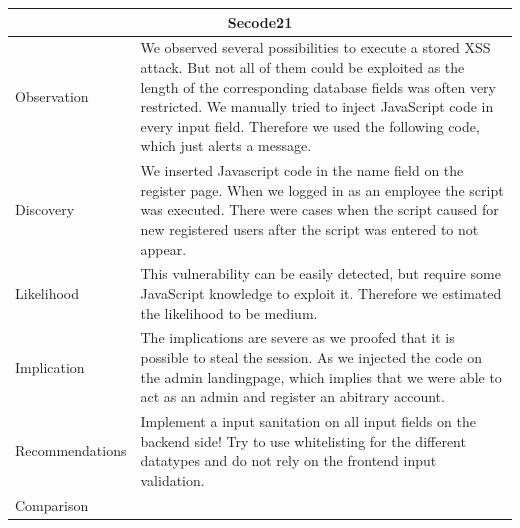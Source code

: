 \documentclass[headsepline,footsepline,footinclude=false,oneside,fontsize=11pt,paper=a4,listof=totoc,bibliography=totoc]{scrbook} %
\begin{document}
\begin{tabular}{ l|p{11cm}  }
	\hline
	\multicolumn{2}{c}{\textbf{Secode21}} \\
	\hline
	Observation   &  We observed several possibilities to execute a stored XSS attack. But not all of
	them could be exploited as the length of the corresponding database fields was
	often very restricted.
	We manually tried to inject JavaScript code in every input field. Therefore we
	used the following code, which just alerts a message. \\
	Discovery  & We inserted Javascript code in the name field on the register page.
	When we logged in as an employee the script was executed.  There were cases when the script caused for new registered users after the script was entered to not appear. \\
	Likelihood & This vulnerability can be easily detected, but require some JavaScript knowledge to exploit it. Therefore we estimated the likelihood to be medium. \\
	Implication    & The implications are severe as we proofed that it is possible to steal the session. As we injected the code on the admin landingpage, which implies that we were able to act as an admin and register an abitrary account. \\
	Recommendations & Implement a input sanitation on all input fields on the backend side!  Try to use whitelisting for the different datatypes and do not rely on the frontend input
	validation. \\
	Comparison& \\
	\hline
\end{tabular}
\end{document}
